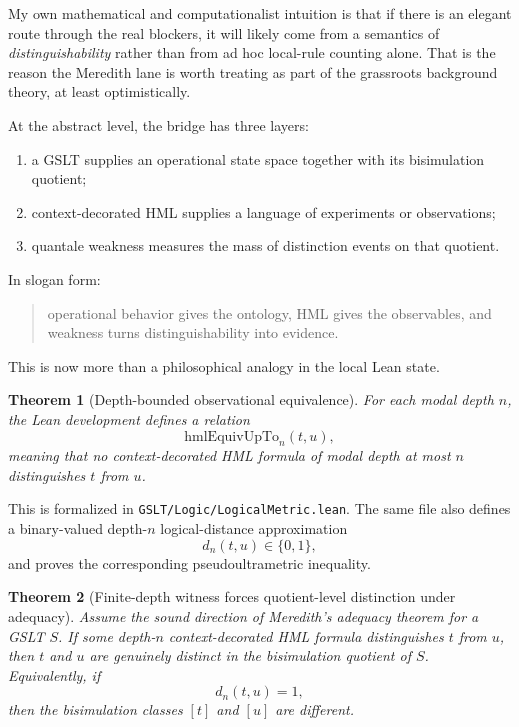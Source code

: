 \documentclass[11pt]{article}
\newtheorem{theorem}{Theorem}[section]
\theoremstyle{remark}
\begin{document}
My own mathematical and computationalist intuition is that if there is an elegant
route through the real blockers, it will likely come from a semantics of
\emph{distinguishability} rather than from ad hoc local-rule counting alone.
That is the reason the Meredith lane is worth treating as part of the grassroots
background theory, at least optimistically.

At the abstract level, the bridge has three layers:
\begin{enumerate}[leftmargin=1.5em]
  \item a GSLT supplies an operational state space together with its bisimulation
  quotient;
  \item context-decorated HML supplies a language of experiments or observations;
  \item quantale weakness measures the mass of distinction events on that quotient.
\end{enumerate}

In slogan form:
\begin{quote}
operational behavior gives the ontology, HML gives the observables, and weakness
turns distinguishability into evidence.
\end{quote}

This is now more than a philosophical analogy in the local Lean state.

\begin{theorem}[Depth-bounded observational equivalence]
For each modal depth \(n\), the Lean development defines a relation
\[
  \mathrm{hmlEquivUpTo}_n(t,u),
\]
meaning that no context-decorated HML formula of modal depth at most \(n\)
distinguishes \(t\) from \(u\).
\end{theorem}

\noindent
This is formalized in \texttt{GSLT/Logic/LogicalMetric.lean}.  The same file also
defines a binary-valued depth-\(n\) logical-distance approximation
\[
  d_n(t,u) \in \{0,1\},
\]
and proves the corresponding pseudoultrametric inequality.

\begin{theorem}[Finite-depth witness forces quotient-level distinction under adequacy]
Assume the sound direction of Meredith's adequacy theorem for a GSLT \(S\).  If
some depth-\(n\) context-decorated HML formula distinguishes \(t\) from \(u\),
then \(t\) and \(u\) are genuinely distinct in the bisimulation quotient of
\(S\).  Equivalently, if
\[
  d_n(t,u) = 1,
\]
then the bisimulation classes \([t]\) and \([u]\) are different.
\end{theorem}
\end{document}
